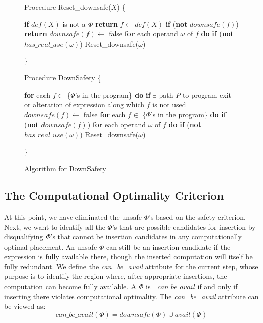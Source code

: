 \begin{figure}[!ht]
\setcounter{linectr}{0}
\centering
\begin{minipage}[t]{5in}
Procedure Reset\_downsafe($X$) 
\{
\begin{code}
 {\bf if} $def(X)$ is not a $\Phi$
   {\bf return}
 $f \leftarrow def(X)$
 {\bf if} ({\bf not} $downsafe(f)$)
   {\bf return}
 $downsafe(f) \leftarrow$ false
 {\bf for} each operand $\omega$ of $f$ {\bf do}
   {\bf if} ({\bf not} $has\_real\_use(\omega)$)
     Reset\_downsafe($\omega$)
\end{code}
\}

Procedure DownSafety
\{
\begin{code}
 {\bf for} each $f \in$ \{$\Phi$'s in the program\} {\bf do}
   {\bf if} $\exists$ path $P$ to program exit or alteration of expression along which $f$ is not used
      $downsafe(f) \leftarrow$ false
 {\bf for} each $f \in$ \{$\Phi$'s in the program\} {\bf do}
   {\bf if} ({\bf not} $downsafe(f)$)
     {\bf for} each operand $\omega$ of $f$ {\bf do}
       {\bf if} ({\bf not} $has\_real\_use(\omega)$)
	    Reset\_downsafe($\omega$)
\end{code}
\}
\end{minipage}
\caption{Algorithm for DownSafety}
\label{fig:downsafety}
\end{figure}

\subsection{The Computational Optimality Criterion}

At this point, we have eliminated the unsafe $\Phi$'s based on the safety 
criterion.  Next, we want
to identify all the $\Phi$'s that are possible candidates for insertion by
disqualifying $\Phi$'s that cannot be insertion candidates in any 
computationally optimal placement.  An unsafe $\Phi$ can still be an insertion
candidate if the expression is fully available there, though the inserted
computation will itself be fully redundant.  
We define the \emph{can\_be\_avail} attribute for the current step, whose 
purpose is to identify the region where, after appropriate insertions,
the computation can become fully available.  A $\Phi$ is 
$\neg can\_be\_avail$ if and only if inserting there violates computational
optimality.  The \emph{can\_be\_avail} attribute can be viewed as:
$$ can\_be\_avail(\Phi) = downsafe(\Phi) \cup avail(\Phi) $$

